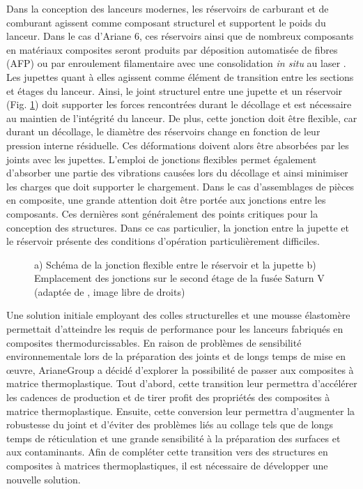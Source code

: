 Dans la conception des lanceurs modernes, les réservoirs de carburant et de comburant agissent comme composant structurel et supportent le poids du lanceur. 
Dans le cas d'Ariane 6, ces réservoirs ainsi que de nombreux composants en matériaux composites seront produits par déposition automatisée de fibres (AFP) ou par enroulement filamentaire avec une consolidation \textit{in situ} au laser \cite{Krzeminski2014}. 
Les jupettes quant à elles agissent comme élément de transition entre les sections et étages du lanceur. 
Ainsi, le joint structurel entre une jupette et un réservoir (Fig. \ref{fig:schema_jonction}) doit supporter les forces rencontrées durant le décollage et est nécessaire au maintien de l'intégrité du lanceur. 
De plus, cette jonction doit être flexible, car durant un décollage, le diamètre des réservoirs change en fonction de leur pression interne résiduelle. 
Ces déformations doivent alors être absorbées par les joints avec les jupettes. 
L'emploi de jonctions flexibles permet également d'absorber une partie des vibrations causées lors du décollage et ainsi minimiser les charges que doit supporter le chargement. 
Dans le cas d'assemblages de pièces en composite, une grande attention doit être portée aux jonctions entre les composants. 
Ces dernières sont généralement des points critiques pour la conception des structures. 
Dans ce cas particulier, la jonction entre la jupette et le réservoir présente des conditions d'opération particulièrement difficiles. 

\begin{figure}[h]
	\centering
	
	\caption{a) Schéma de la jonction flexible entre le réservoir et la jupette b) Emplacement des jonctions sur le second étage de la fusée Saturn V (adaptée de \cite{OfficeofMannedSpaceFligt1968}, image libre de droits) }
	\label{fig:schema_jonction}
\end{figure}

Une solution initiale employant des colles structurelles et une mousse élastomère permettait d'atteindre les requis de performance pour les lanceurs fabriqués en composites thermodurcissables. 
En raison de problèmes de sensibilité environnementale lors de la préparation des joints et de longs temps de mise en œuvre, ArianeGroup a décidé d'explorer la possibilité de passer aux composites à matrice thermoplastique. 
Tout d'abord, cette transition leur permettra d'accélérer les cadences de production et de tirer profit des propriétés des composites à matrice thermoplastique. 
Ensuite, cette conversion leur permettra d'augmenter la robustesse du joint et d'éviter des problèmes liés au collage tels que de longs temps de réticulation et une grande sensibilité à la préparation des surfaces et aux contaminants. 
Afin de compléter cette transition vers des structures en composites à matrices thermoplastiques, il est nécessaire de développer une nouvelle solution. 

